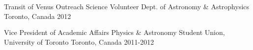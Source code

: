 \begin{cvhonors}
  \cvhonor
    {Transit of Venus Outreach Science Volunteer} %
    {Dept. of Astronomy \& Astrophysics} %
    {Toronto, Canada} %
    {2012} %

  \cvhonor
    {Vice President of Academic Affairs} %
    {Physics \& Astronomy Student Union, University of Toronto} %
    {Toronto, Canada} %
    {2011-2012} %

\end{cvhonors}
